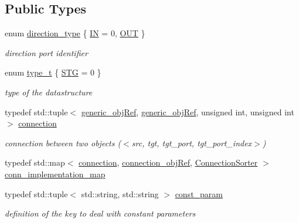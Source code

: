 \subsection*{Public Types}
\begin{DoxyCompactItemize}
\item 
enum \hyperlink{classconn__binding_af1575e7a7dc7acd00fc5c947f413c663}{direction\+\_\+type} \{ \hyperlink{classconn__binding_af1575e7a7dc7acd00fc5c947f413c663aa68bce108f8394f35145f4342546beac}{IN} = 0, 
\hyperlink{classconn__binding_af1575e7a7dc7acd00fc5c947f413c663a754ed18cd3b2e1d50168f142fce6b00a}{O\+UT}
 \}\begin{DoxyCompactList}\small\item\em direction port identifier \end{DoxyCompactList}
\item 
enum \hyperlink{classconn__binding_ab68bc4dff16c46775bdd39f61d5ff7bf}{type\+\_\+t} \{ \hyperlink{classconn__binding_ab68bc4dff16c46775bdd39f61d5ff7bfab2003934da8adbe0ac312330dc834eb9}{S\+TG} = 0
 \}\begin{DoxyCompactList}\small\item\em type of the datastructure \end{DoxyCompactList}
\item 
typedef std\+::tuple$<$ \hyperlink{generic__obj_8hpp_acb533b2ef8e0fe72e09a04d20904ca81}{generic\+\_\+obj\+Ref}, \hyperlink{generic__obj_8hpp_acb533b2ef8e0fe72e09a04d20904ca81}{generic\+\_\+obj\+Ref}, unsigned int, unsigned int $>$ \hyperlink{classconn__binding_aefee92bcc9e59d19b7a3e55e2cbdf615}{connection}
\begin{DoxyCompactList}\small\item\em connection between two objects ($<$src, tgt, tgt\+\_\+port, tgt\+\_\+port\+\_\+index$>$) \end{DoxyCompactList}\item 
typedef std\+::map$<$ \hyperlink{classconn__binding_aefee92bcc9e59d19b7a3e55e2cbdf615}{connection}, \hyperlink{connection__obj_8hpp_af3c6e389c8543ed97dd9ba412f2c141b}{connection\+\_\+obj\+Ref}, \hyperlink{structconn__binding_1_1ConnectionSorter}{Connection\+Sorter} $>$ \hyperlink{classconn__binding_a352bfe56b0a7f7b3c9763bf90c87f785}{conn\+\_\+implementation\+\_\+map}
\item 
typedef std\+::tuple$<$ std\+::string, std\+::string $>$ \hyperlink{classconn__binding_a08cb5241cd588e215f61ab30d27a14c0}{const\+\_\+param}
\begin{DoxyCompactList}\small\item\em definition of the key to deal with constant parameters \end{DoxyCompactList}\item 

\end{DoxyCompactItemize}

